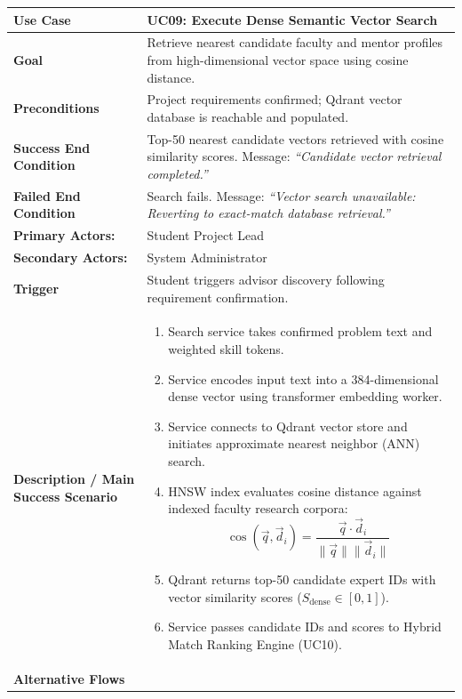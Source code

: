 \begin{table}[H]
\centering
\small
\begin{tabularx}{\textwidth}{|l|X|}
\hline
\rowcolor{lightgray!40} \textbf{Use Case} & \textbf{UC09: Execute Dense Semantic Vector Search} \\ \hline
\textbf{Goal} & Retrieve nearest candidate faculty and mentor profiles from high-dimensional vector space using cosine distance. \\ \hline
\textbf{Preconditions} & Project requirements confirmed; Qdrant vector database is reachable and populated. \\ \hline
\textbf{Success End Condition} & Top-50 nearest candidate vectors retrieved with cosine similarity scores. Message: \textit{``Candidate vector retrieval completed.''} \\ \hline
\textbf{Failed End Condition} & Search fails. Message: \textit{``Vector search unavailable: Reverting to exact-match database retrieval.''} \\ \hline
\textbf{Primary Actors:} & Student Project Lead \\
\textbf{Secondary Actors:} & System Administrator \\ \hline
\textbf{Trigger} & Student triggers advisor discovery following requirement confirmation. \\ \hline
\textbf{Description / Main Success Scenario} &
\begin{enumerate}[leftmargin=*]
    \item Search service takes confirmed problem text and weighted skill tokens.
    \item Service encodes input text into a 384-dimensional dense vector using transformer embedding worker.
    \item Service connects to Qdrant vector store and initiates approximate nearest neighbor (ANN) search.
    \item HNSW index evaluates cosine distance against indexed faculty research corpora:
    $$\cos(\vec{q}, \vec{d}_i) = \frac{\vec{q} \cdot \vec{d}_i}{\|\vec{q}\| \|\vec{d}_i\|}$$
    \item Qdrant returns top-50 candidate expert IDs with vector similarity scores ($S_{\text{dense}} \in [0, 1]$).
    \item Service passes candidate IDs and scores to Hybrid Match Ranking Engine (UC10).
\end{enumerate} \\ \hline
\textbf{Alternative Flows} &
\begin{itemize}[leftmargin=*]

\end{itemize}
\end{tabularx}
\end{table}
